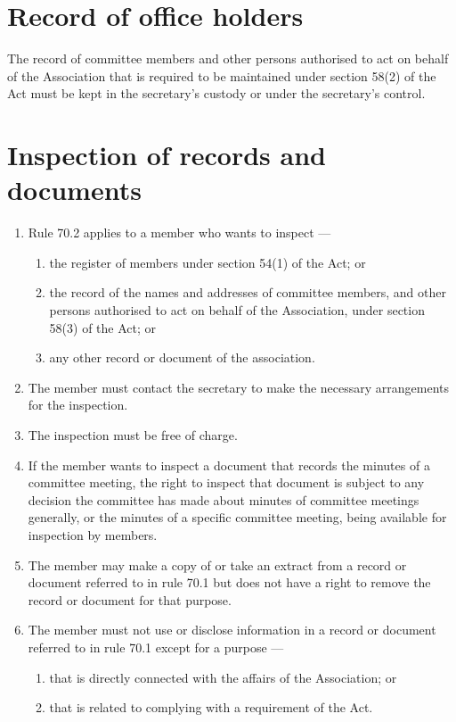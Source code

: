 \hypertarget{record-of-office-holders}{%
\section{Record of office holders}\label{record-of-office-holders}}

The record of committee members and other persons authorised to act on behalf of the Association that is required to be maintained under section 58(2) of the Act must be kept in the secretary's custody or under the secretary's control.

\hypertarget{inspection-of-records-and-documents}{%
\section{Inspection of records and documents}\label{inspection-of-records-and-documents}}

\begin{enumerate}

\item Rule 70.2 applies to a member who wants to inspect ---

  \begin{enumerate}
  
  \item the register of members under section 54(1) of the Act; or
  \item the record of the names and addresses of committee members, and other persons authorised to act on behalf of the Association, under section 58(3) of the Act; or
  \item any other record or document of the association.
  \end{enumerate}
\item The member must contact the secretary to make the necessary arrangements for the inspection.
\item The inspection must be free of charge.
\item If the member wants to inspect a document that records the minutes of a committee meeting, the right to inspect that document is subject to any decision the committee has made about minutes of committee meetings generally, or the minutes of a specific committee meeting, being available for inspection by members.
\item The member may make a copy of or take an extract from a record or document referred to in rule 70.1 but does not have a right to remove the record or document for that purpose.
\item The member must not use or disclose information in a record or document referred to in rule 70.1 except for a purpose ---

  \begin{enumerate}
  
  \item that is directly connected with the affairs of the Association; or
  \item that is related to complying with a requirement of the Act.
  \end{enumerate}
\end{enumerate}

